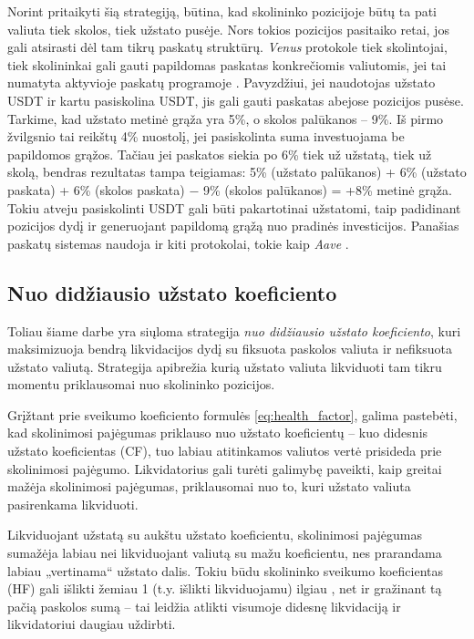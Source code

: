 \documentclass[]{VUMIFTemplateClass}
\begin{document}
Norint pritaikyti šią strategiją, būtina, kad skolininko pozicijoje būtų ta pati valiuta tiek skolos, tiek užstato pusėje. Nors tokios pozicijos pasitaiko retai, jos gali atsirasti dėl tam tikrų paskatų struktūrų. \textit{Venus} protokole tiek skolintojai, tiek skolininkai gali gauti papildomas paskatas konkrečiomis valiutomis, jei tai numatyta aktyvioje paskatų programoje \cite{venusrewards}. Pavyzdžiui, jei naudotojas užstato USDT ir kartu pasiskolina USDT, jis gali gauti paskatas abejose pozicijos pusėse. Tarkime, kad užstato metinė grąža yra 5\%, o skolos palūkanos – 9\%. Iš pirmo žvilgsnio tai reikštų 4\% nuostolį, jei pasiskolinta suma investuojama be papildomos grąžos. Tačiau jei paskatos siekia po 6\% tiek už užstatą, tiek už skolą, bendras rezultatas tampa teigiamas: 5\% (užstato palūkanos) + 6\% (užstato paskata) + 6\% (skolos paskata) − 9\% (skolos palūkanos) = +8\% metinė grąža. Tokiu atveju pasiskolinti USDT gali būti pakartotinai užstatomi, taip padidinant pozicijos dydį ir generuojant papildomą grąžą nuo pradinės investicijos. Panašias paskatų sistemas naudoja ir kiti protokolai, tokie kaip \textit{Aave} \cite{aaveincentives}.

\subsection{Nuo didžiausio užstato koeficiento}
\label{sec:from_largest_cf}

Toliau šiame darbe yra siųloma strategija \textit{nuo didžiausio užstato koeficiento}, kuri maksimizuoja bendrą likvidacijos dydį su fiksuota paskolos valiuta ir nefiksuota užstato valiutą. Strategija apibrežia kurią užstato valiuta likviduoti tam tikru momentu priklausomai nuo skolininko pozicijos.

Grįžtant prie sveikumo koeficiento formulės \ref{eq:health_factor}, galima pastebėti, kad skolinimosi pajėgumas priklauso nuo užstato koeficientų – kuo didesnis užstato koeficientas (CF), tuo labiau atitinkamos valiutos vertė prisideda prie skolinimosi pajėgumo. Likvidatorius gali turėti galimybę paveikti, kaip greitai mažėja skolinimosi pajėgumas, priklausomai nuo to, kuri užstato valiuta pasirenkama likviduoti. 

Likviduojant užstatą su aukštu užstato koeficientu, skolinimosi pajėgumas sumažėja labiau nei likviduojant valiutą su mažu koeficientu, nes prarandama labiau „vertinama“ užstato dalis. Tokiu būdu skolininko sveikumo koeficientas (HF) gali išlikti žemiau 1 (t.y. išlikti likviduojamu) ilgiau , net ir gražinant tą pačią paskolos sumą – tai leidžia atlikti visumoje didesnę likvidaciją ir likvidatoriui daugiau uždirbti.
\end{document}
